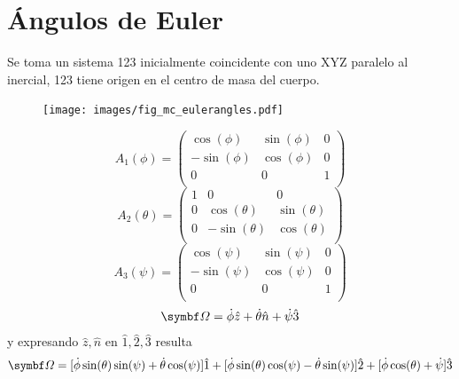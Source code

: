 \documentclass[10pt,oneside]{CBFT_book}
\begin{document}
\section{Ángulos de Euler}

Se toma un sistema 123 inicialmente coincidente con uno XYZ paralelo al inercial, 123 tiene origen
en el centro de masa del cuerpo.
\begin{figure}[htb]
	\begin{center}
	\texttt{[image: images/fig\_mc\_eulerangles.pdf]}	 
	\end{center}
	\caption{}
\end{figure} 
\[
	A_1(\phi) = 
	\begin{pmatrix}
		\cos(\phi) & \sin(\phi) & 0 \\
		-\sin(\phi) & \cos(\phi) & 0 \\ 
		0 & 0 & 1  \\
	\end{pmatrix}
\]
\[
	A_2(\theta) = 
	\begin{pmatrix}
		1 & 0 & 0 \\
		0 & \cos(\theta) & \sin(\theta) \\ 
		0 & -\sin(\theta) & \cos(\theta)  \\
	\end{pmatrix}
\]
\[
	A_3(\psi) = 
	\begin{pmatrix}
		\cos(\psi) & \sin(\psi) & 0 \\
		-\sin(\psi) & \cos(\psi) & 0 \\ 
		0 & 0 & 1  \\
	\end{pmatrix}
\]
\[
	\vb{\Omega} = \dot{\phi}\hat{z} + \dot{\theta}\hat{n} + \dot{\psi}\hat{3}
\]
y expresando $\hat{z},\hat{n}$ en $\hat{1},\hat{2}, \hat{3}$ resulta
\[
	\vb{\Omega} = [\dot{\phi}\sin(\theta)\sin(\psi) + \dot{\theta}\cos(\psi) ]\hat{1} +
			[\dot{\phi}\sin(\theta)\cos(\psi) - \dot{\theta}\sin(\psi) ] \hat{2} +
			[\dot{\phi}\cos(\theta) + \dot{\psi} ]\hat{3}
\]
\end{document}
